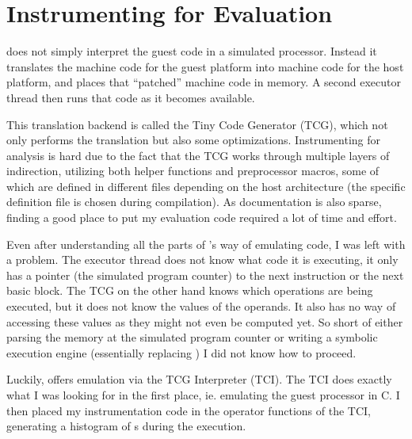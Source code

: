 \section{Instrumenting \qemu{} for Evaluation}
\qemu{} does not simply interpret the guest code in a simulated processor.
Instead it translates the machine code for the guest platform into machine code for the host platform, and places that ``patched'' machine code in memory.
A second executor thread then runs that code as it becomes available.

This translation backend is called the Tiny Code Generator (TCG), which not only performs the translation but also some optimizations.
Instrumenting \qemu{} for analysis is hard due to the fact that the TCG works through multiple layers of indirection, utilizing both helper functions and preprocessor macros, some of which are defined in different files depending on the host architecture (the specific definition file is chosen during compilation).
As documentation is also sparse, finding a good place to put my evaluation code required a lot of time and effort.

Even after understanding all the parts of \qemu{}'s way of emulating code, I was left with a problem.
The executor thread does not know what code it is executing, it only has a pointer (the simulated program counter) to the next instruction or the next basic block.
The TCG on the other hand knows which operations are being executed, but it does not know the values of the operands.
It also has no way of accessing these values as they might not even be computed yet.
So short of either parsing the memory at the simulated program counter or writing a symbolic execution engine (essentially replacing \qemu{}) I did not know how to proceed.

Luckily, \qemu{} offers emulation via the TCG Interpreter (TCI).
The TCI does exactly what I was looking for in the first place, ie. emulating the guest processor in C.
I then placed my instrumentation code in the operator functions of the TCI, generating a histogram of \hammingw{}s during the execution.
